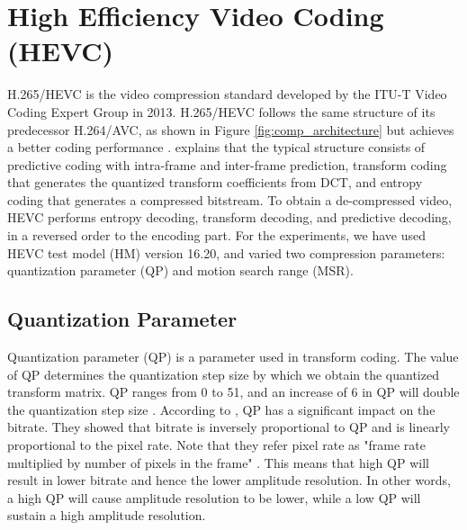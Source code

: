 \section{High Efficiency Video Coding (HEVC)}
\label{sec:background/section_c}

H.265/HEVC is the video compression standard developed by the ITU-T Video Coding Expert Group in 2013. H.265/HEVC follows the same structure of its predecessor H.264/AVC, as shown in Figure \ref{fig:comp_architecture} but achieves a better coding performance \cite{zhang_overview_2019}. \citeauthor{zhang_overview_2019} \cite{zhang_overview_2019} explains that the typical structure consists of predictive coding with intra-frame and inter-frame prediction, transform coding that generates the quantized transform coefficients from DCT, and entropy coding that generates a compressed bitstream. To obtain a de-compressed video, HEVC performs entropy decoding, transform decoding, and predictive decoding, in a reversed order to the encoding part. For the experiments, we have used HEVC test model (HM) version 16.20, and varied two compression parameters: quantization parameter (QP) and motion search range (MSR).

\subsection{Quantization Parameter}
\label{subsec:background/section_c/qp}
Quantization parameter (QP) is a parameter used in transform coding. The value of QP determines the quantization step size by which we obtain the quantized transform matrix. QP ranges from 0 to 51, and an increase of 6 in QP will double the quantization step size \cite{sullivan_overview_2012} \cite{budagavi_hevc_2014}. According to \cite{sharrab_modeling_2017}, QP has a significant impact on the bitrate. They showed that bitrate is inversely proportional to QP and is linearly proportional to the pixel rate. Note that they refer pixel rate as "frame rate multiplied by number of pixels in the frame" \cite[p.~7]{sharrab_modeling_2017}. This means that high QP will result in lower bitrate and hence the lower amplitude resolution. In other words, a high QP will cause amplitude resolution to be lower, while a low QP will sustain a high amplitude resolution.

